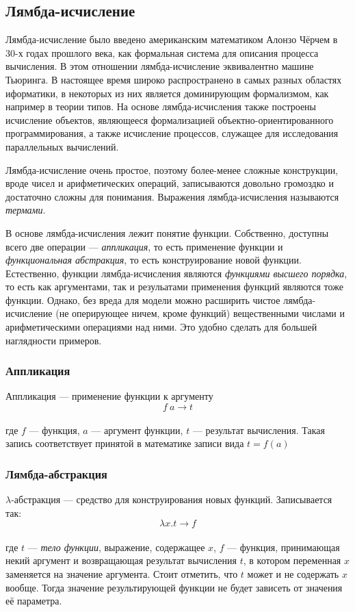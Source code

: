 \documentclass[a4paper, 12pt, titlepage, twoside]{article}
\begin{document}
\subsection{Лямбда-исчисление}
Лямбда-исчисление было введено американским математиком Алонзо Чёрчем в 30-х годах прошлого века, как формальная система для описания процесса вычисления. В этом отношении лямбда-исчисление эквивалентно машине Тьюринга. В настоящее время широко распространено в самых разных областях иформатики, в некоторых из них является доминирующим формализмом, как например в теории типов. На основе лямбда-исчисления также построены исчисление объектов, являющееся формализацией объектно-ориентированного программирования, а также исчисление процессов, служащее для исследования параллельных вычислений.

Лямбда-исчисление очень простое, поэтому более-менее сложные конструкции, вроде чисел и арифметических операций, записываются довольно громоздко и достаточно сложны для понимания. Выражения лямбда-исчисления называются \textit{термами}.

В основе лямбда-исчисления лежит понятие функции. Собственно, доступны всего две операции --- \textit{аппликация}, то есть применение функции и \textit{функциональная абстракция}, то есть конструирование новой функции. Естественно, функции лямбда-исчисления являются \textit{функциями высшего порядка}, то есть как аргументами, так и резульатами применения функций являются тоже функции. Однако, без вреда для модели можно расширить чистое лямбда-исчисление (не оперирующее ничем, кроме функций) вещественными числами и арифметическими операциями над ними. Это удобно сделать для большей наглядности примеров.

\subsubsection{Аппликация}
Аппликация --- применение функции к аргументу
\[f\ a\longrightarrow t\]\\
где $f$ --- функция, $a$ --- аргумент функции, $t$ --- результат вычисления. Такая запись соответствует принятой в математике записи вида $t = f(a)$

\subsubsection{Лямбда-абстракция}
$\lambda$-абстракция --- средство для конструирования новых функций. Записывается так:
\[\lambda x.t\longrightarrow f\]\\
где $t$ --- \textit{тело функции}, выражение, содержащее $x$, $f$ --- функция, принимающая некий аргумент и возвращающая результат вычисления $t$, в котором переменная $x$ заменяется на значение аргумента. Стоит отметить, что $t$ может и не содержать $x$ вообще. Тогда значение результирующей функции не будет зависеть от значения её параметра.
\end{document}

